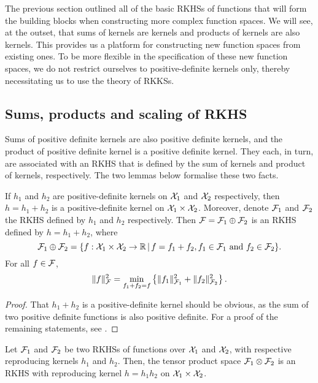 
The previous section outlined all of the basic RKHSs of functions that will form the building blocks when constructing more complex function spaces.
We will see, at the outset, that sums of kernels are kernels and products of kernels are also kernels. 
This provides us a platform for constructing new function spaces from existing ones.
To be more flexible in the specification of these new function spaces, we do not restrict ourselves to positive-definite kernels only, thereby necessitating us to use the theory of RKKSs.

\subsection{Sums, products and scaling of RKHS}

Sums of positive definite kernels are also positive definite kernels, and the product of positive definite kernel is a positive definite kernel.
They each, in turn, are associated with an RKHS that is defined by the sum of kernels and product of kernels, respectively.
The two lemmas below formalise these two facts. 

\begin{lemma}\label{thm:sumkernels}
  If $h_1$ and $h_2$ are positive-definite kernels on ${\mathcal X}_1$ and ${\mathcal X}_2$ respectively, then $h = h_1 + h_2$ is a positive-definite kernel on ${\mathcal X}_1 \times {\mathcal X}_2$.
  Moreover, denote ${\mathcal F}_1$ and ${\mathcal F}_2$ the RKHS defined by $h_1$ and $h_2$ respectively.
  Then ${\mathcal F} = {\mathcal F}_1 \oplus {\mathcal F}_2$ is an RKHS defined by $h = h_1 + h_2$, where
  \[
    {\mathcal F}_1 \oplus {\mathcal F}_2 = \{ f:{\mathcal X}_1\times{\mathcal X}_2 \to\mathbb{R} \,|\, f = f_1 + f_2, f_1\in{\mathcal F}_1 \text{ and } f_2\in{\mathcal F}_2 \}.
  \]
  For all $f\in{\mathcal F}$,
  \[
    \lVert f\rVert_{\mathcal F}^2 = \min_{f_1+f_2=f} \left\{ \lVert f_1\rVert_{{\mathcal F}_1}^2 + \lVert f_2\rVert_{{\mathcal F}_2}^2 \right\}.
  \]
\end{lemma}

\begin{proof}
  That $h_1+h_2$ is a positive-definite kernel should be obvious, as the sum of two positive definite functions is also positive definite.
  For a proof of the remaining statements, see \citet[Theorem 5]{berlinet2011reproducing}.
\end{proof}

\begin{lemma}\label{thm:prodkernels}
  Let ${\mathcal F}_1$ and ${\mathcal F}_2$ be two RKHSs of functions over ${\mathcal X}_1$ and ${\mathcal X}_2$, with respective reproducing kernels $h_1$ and $h_2$.
  Then, the tensor product space ${\mathcal F}_1 \otimes {\mathcal F}_2$ is an RKHS with reproducing kernel $h = h_1 h_2$ on ${\mathcal X}_1 \times {\mathcal X}_2$.
\end{lemma}

